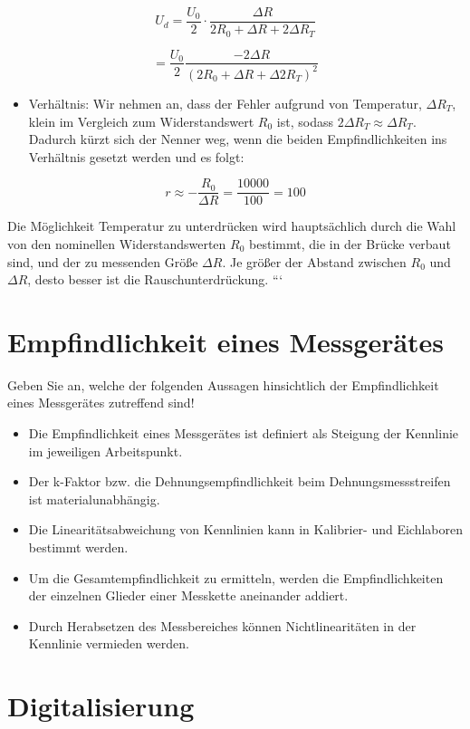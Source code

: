 \documentclass[
]{book}
\providecommand{\tightlist}{%
  \setlength{\itemsep}{0pt}\setlength{\parskip}{0pt}}
\begin{document}
\[U_d = \frac{U_0}{2} \cdot \frac{\Delta R}{2R_0 + \Delta R + 2\Delta R_T}\]

\[  = \frac{U_0}{2} \frac{-2\Delta R}{(2R_0 + \Delta R + \Delta 2R_T)^2}\]

\begin{itemize}
\tightlist
\item
  Verhältnis: Wir nehmen an, dass der Fehler aufgrund von Temperatur, \(\Delta R_T\), klein im Vergleich zum Widerstandswert \(R_0\) ist, sodass \(2 \Delta R_T \approx \Delta R_T\). Dadurch kürzt sich der Nenner weg, wenn die beiden Empfindlichkeiten ins Verhältnis gesetzt werden und es folgt:
\end{itemize}

\[r \approx -\frac{R_0}{\Delta R} = \frac{10000}{100} = 100\]

Die Möglichkeit Temperatur zu unterdrücken wird hauptsächlich durch die Wahl von den nominellen Widerstandswerten \(R_0\) bestimmt, die in der Brücke verbaut sind, und der zu messenden Größe \(\Delta R\). Je größer der Abstand zwischen \(R_0\) und \(\Delta R\), desto besser ist die Rauschunterdrückung. ```

\section{Empfindlichkeit eines Messgerätes}\label{empfindlichkeit-eines-messgeruxe4tes}

Geben Sie an, welche der folgenden Aussagen hinsichtlich der Empfindlichkeit eines Messgerätes zutreffend sind!

\begin{itemize}
\tightlist
\item
  Die Empfindlichkeit eines Messgerätes ist definiert als Steigung der Kennlinie im jeweiligen Arbeitspunkt.
\item
  Der k-Faktor bzw. die Dehnungsempfindlichkeit beim Dehnungsmessstreifen ist materialunabhängig.
\item
  Die Linearitätsabweichung von Kennlinien kann in Kalibrier- und Eichlaboren bestimmt werden.
\item
  Um die Gesamtempfindlichkeit zu ermitteln, werden die Empfindlichkeiten der einzelnen Glieder einer Messkette aneinander addiert.
\item
  Durch Herabsetzen des Messbereiches können Nichtlinearitäten in der Kennlinie vermieden werden.
\end{itemize}

\section{Digitalisierung}\label{digitalisierung}
\end{document}
